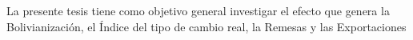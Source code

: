 \begin{Resumen}
La presente tesis tiene como objetivo general investigar el efecto que genera la Bolivianización, el Índice del tipo de cambio real, la Remesas y las Exportaciones 


\end{Resumen}